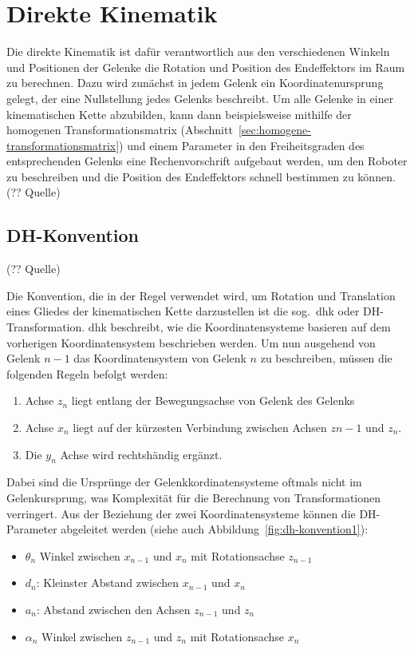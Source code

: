 \cleardoublepage


\chapter{Direkte Kinematik}

Die direkte Kinematik ist dafür verantwortlich aus den verschiedenen Winkeln und Positionen der Gelenke die Rotation und Position des Endeffektors im Raum zu berechnen.
Dazu wird zunächst in jedem Gelenk ein Koordinatenursprung gelegt, der eine Nullstellung jedes Gelenks beschreibt.
Um alle Gelenke in einer kinematischen Kette abzubilden, kann dann beispielsweise mithilfe der homogenen Transformationsmatrix (Abschnitt~\ref{sec:homogene-transformationsmatrix}) und einem Parameter in den Freiheitsgraden des entsprechenden Gelenks eine Rechenvorschrift aufgebaut werden, um den Roboter zu beschreiben und die Position des Endeffektors schnell bestimmen zu können. (?? Quelle)


\section{DH-Konvention}

(?? Quelle)

Die Konvention, die in der Regel verwendet wird, um Rotation und Translation eines Gliedes der kinematischen Kette darzustellen ist die sog.\ \ac{dhk} oder DH-Transformation.
\ac{dhk} beschreibt, wie die Koordinatensysteme basieren auf dem vorherigen Koordinatensystem beschrieben werden.
Um nun ausgehend von Gelenk $n-1$ das Koordinatensystem von Gelenk $n$ zu beschreiben, müssen die folgenden Regeln befolgt werden:

\begin{enumerate}
    \item Achse $z_{n}$ liegt entlang der Bewegungsachse von Gelenk des Gelenks
    \item Achse $x_{n}$ liegt auf der kürzesten Verbindung zwischen Achsen $z{n-1}$ und $z_{n}$.
    \item Die $y_{n}$ Achse wird rechtshändig ergänzt.
\end{enumerate}

Dabei sind die Ursprünge der Gelenkkordinatensysteme oftmals nicht im Gelenkursprung, was Komplexität für die Berechnung von Transformationen verringert.
Aus der Beziehung der zwei Koordinatensysteme können die DH-Parameter abgeleitet werden (siehe auch Abbildung~\ref{fig:dh-konvention1}):

\begin{itemize}
    \item $\theta_n$ Winkel zwischen $x_{n-1}$ und $x_n$ mit Rotationsachse $z_{n-1}$
    \item $d_n$: Kleinster Abstand zwischen $x_{n-1}$ und $x_n$
    \item $a_n$: Abstand zwischen den Achsen $z_{n-1}$ und $z_n$
    \item $\alpha_n$ Winkel zwischen $z_{n-1}$ und $z_n$ mit Rotationsachse $x_{n}$
\end{itemize}

